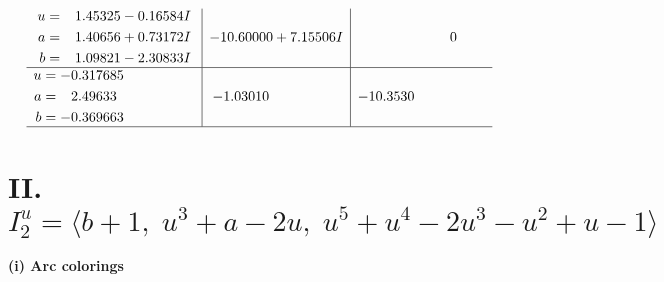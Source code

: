\documentclass[1p]{elsarticle_modified}
\theoremstyle{definition}
\begin{document}
$$\begin{array}{c|c|c}
\begin{aligned}
u &= \phantom{-}1.45325 - 0.16584 I \\
a &= \phantom{-}1.40656 + 0.73172 I \\
b &= \phantom{-}1.09821 - 2.30833 I\end{aligned}
 & -10.60000 + 7.15506 I & \phantom{-0.000000 } 0 \\ \hline\begin{aligned}
u &= -0.317685\phantom{ +0.000000I} \\
a &= \phantom{-}2.49633\phantom{ +0.000000I} \\
b &= -0.369663\phantom{ +0.000000I}\end{aligned}
 & -1.03010\phantom{ +0.000000I} & -10.3530\phantom{ +0.000000I}\\
 \hline 
 \end{array}$$\newpage\newpage\renewcommand{\arraystretch}{1}
\centering \section*{II. $I^u_{2}= \langle b+1,\;u^3+a-2 u,\;u^5+u^4-2 u^3- u^2+u-1 \rangle$}
\flushleft \textbf{(i) Arc colorings}\\
\end{document}
